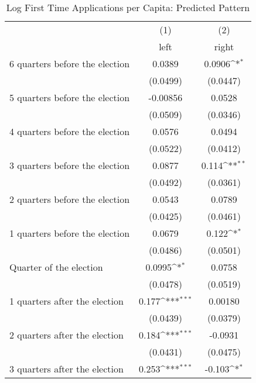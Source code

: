 \begin{table}[htbp]\centering
\def\sym#1{\ifmmode^{#1}\else\(^{#1}\)\fi}
\caption{Log First Time Applications per Capita: Predicted Pattern}
\begin{tabular}{l*{2}{c}}
\hline\hline
                    &\multicolumn{1}{c}{(1)}&\multicolumn{1}{c}{(2)}\\
                    &\multicolumn{1}{c}{left}&\multicolumn{1}{c}{right}\\
\hline
 6 quarters before the election&      0.0389         &      0.0906\sym{*}  \\
                    &    (0.0499)         &    (0.0447)         \\
[1em]
 5 quarters before the election&    -0.00856         &      0.0528         \\
                    &    (0.0509)         &    (0.0346)         \\
[1em]
 4 quarters before the election&      0.0576         &      0.0494         \\
                    &    (0.0522)         &    (0.0412)         \\
[1em]
 3 quarters before the election&      0.0877         &       0.114\sym{**} \\
                    &    (0.0492)         &    (0.0361)         \\
[1em]
 2 quarters before the election&      0.0543         &      0.0789         \\
                    &    (0.0425)         &    (0.0461)         \\
[1em]
 1 quarters before the election&      0.0679         &       0.122\sym{*}  \\
                    &    (0.0486)         &    (0.0501)         \\
[1em]
Quarter of the election&      0.0995\sym{*}  &      0.0758         \\
                    &    (0.0478)         &    (0.0519)         \\
[1em]
 1 quarters after the election&       0.177\sym{***}&     0.00180         \\
                    &    (0.0439)         &    (0.0379)         \\
[1em]
 2 quarters after the election&       0.184\sym{***}&     -0.0931         \\
                    &    (0.0431)         &    (0.0475)         \\
[1em]
 3 quarters after the election&       0.253\sym{***}&      -0.103\sym{*}  \\

\end{tabular}
\end{table}
